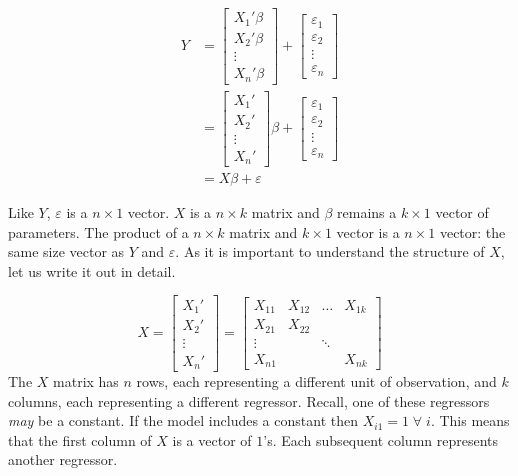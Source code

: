 \documentclass[
  letterpaper,
  DIV=11,
  numbers=noendperiod]{scrreprt}
\begin{document}
\[
\begin{align}
Y&=\begin{bmatrix}X_1'\beta\\ X_2'\beta \\ \vdots\\ X_n'\beta \end{bmatrix}+ \begin{bmatrix}\varepsilon_1\\ \varepsilon_2 \\ \vdots\\ \varepsilon_n \end{bmatrix}\\
&=\begin{bmatrix}X_1'\\ X_2' \\ \vdots\\ X_n' \end{bmatrix}\beta+ \begin{bmatrix}\varepsilon_1\\ \varepsilon_2 \\ \vdots\\ \varepsilon_n \end{bmatrix}\\
&=X\beta+\varepsilon
\end{align}
\]

Like \(Y\), \(\varepsilon\) is a \(n\times 1\) vector. \(X\) is a
\(n\times k\) matrix and \(\beta\) remains a \(k\times 1\) vector of
parameters. The product of a \(n\times k\) matrix and \(k\times 1\)
vector is a \(n\times 1\) vector: the same size vector as \(Y\) and
\(\varepsilon\). As it is important to understand the structure of
\(X\), let us write it out in detail.

\[
X = \begin{bmatrix}X_1'\\ X_2' \\ \vdots\\ X_n' \end{bmatrix} = \begin{bmatrix}X_{11} & X_{12}&\dots&X_{1k}\\ X_{21}& X_{22}& & \\ \vdots & & \ddots &\\ X_{n1} & & & X_{nk} \end{bmatrix}
\] The \(X\) matrix has \(n\) rows, each representing a different unit
of observation, and \(k\) columns, each representing a different
regressor. Recall, one of these regressors \emph{may} be a constant. If
the model includes a constant then \(X_{i1}=1\;\forall\;i\). This means
that the first column of \(X\) is a vector of \(1\)'s. Each subsequent
column represents another regressor.
\end{document}
